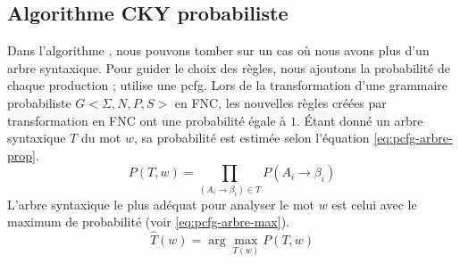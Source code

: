 \documentclass{KodeBook}
\begin{document}
\subsection{Algorithme CKY probabiliste}

Dans l'algorithme , nous pouvons tomber sur un cas où nous avons plus d'un arbre syntaxique. 
Pour guider le choix des règles, nous ajoutons la probabilité de chaque production ; utilise une \ac{pcfg}.
Lors de la transformation d'une grammaire probabiliste $G<\Sigma, N, P, S>$ en FNC, les nouvelles règles créées par transformation en FNC ont une probabilité égale à $1$.
Étant donné un arbre syntaxique $T$ du mot $w$, sa probabilité est estimée selon l'équation \ref{eq:pcfg-arbre-prop}.
\begin{equation}
P(T, w) = \prod\limits_{(A_i \rightarrow \beta_i) \in T} P(A_i \rightarrow \beta_i)
\label{eq:pcfg-arbre-prop}
\end{equation}
L'arbre syntaxique le plus adéquat pour analyser le mot $w$ est celui avec le maximum de probabilité (voir \ref{eq:pcfg-arbre-max}).
\begin{equation}
\hat{T}(w) = \arg\max\limits_{T(w)} P(T, w)
\label{eq:pcfg-arbre-max}
\end{equation}
\end{document}

